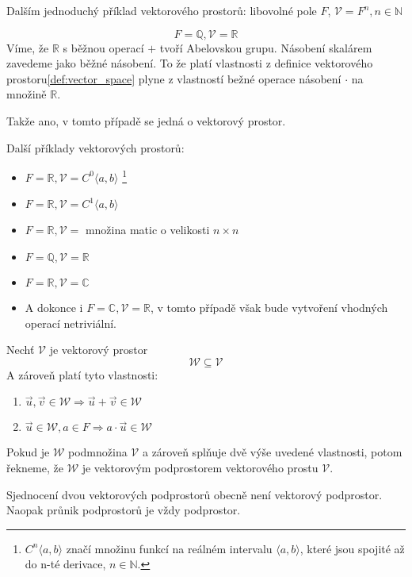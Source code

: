 Dalším jednoduchý příklad vektorového prostorů:
libovolné pole $F$, $\mathcal{V} = F^n, n \in \mathbb{N}$

\begin{example}
    $$F = \mathbb{Q}, \mathcal{V} = \mathbb{R}$$
    Víme, že $\mathbb{R}$ s běžnou operací $+$ tvoří Abelovskou grupu.
    Násobení skalárem zavedeme jako běžné násobení.
    To že platí vlastnosti z definice vektorového prostoru\ref{def:vector_space}
    plyne z vlastností bežné operace násobení $\cdot$ na množině $\mathbb{R}$.

    Takže ano, v tomto případě se jedná o vektorový prostor.
\end{example}

Další příklady vektorových prostorů:
\begin{itemize}
    \item $F = \mathbb{R}, \mathcal{V} = C^0\langle a, b \rangle$
        \footnote{$C^n\langle a,b \rangle$ značí množinu funkcí na reálném intervalu
        $\langle a,b \rangle$, které jsou spojité až do n-té derivace, $n \in \mathbb{N}$.}
    \item $F = \mathbb{R}, \mathcal{V} = C^1\langle a, b \rangle$
    \item $F = \mathbb{R}, \mathcal{V}=$ množina matic o velikosti $n \times n$
    \item $F = \mathbb{Q}, \mathcal{V} = \mathbb{R}$
    \item $F = \mathbb{R}, \mathcal{V} = \mathbb{C}$
    \item A dokonce i $F = \mathbb{C}, \mathcal{V} = \mathbb{R}$, v tomto případě však bude
        vytvoření vhodných operací netriviální.
\end{itemize}

\begin{definition}
    Nechť $\mathcal{V}$ je vektorový prostor
    $$\mathcal{W} \subseteq \mathcal{V}$$
    A zároveň platí tyto vlastnosti:
    \begin{enumerate}
        \item $\vec{u}, \vec{v} \in \mathcal{W} \Rightarrow \vec{u} + \vec{v} \in \mathcal{W}$
        \item $\vec{u} \in \mathcal{W}, a \in F \Rightarrow  a \cdot \vec{u} \in \mathcal{W}$
    \end{enumerate}

    Pokud je $\mathcal{W}$ podmnožina $\mathcal{V}$ a zároveň splňuje dvě výše uvedené vlastnosti,
    potom řekneme, že $\mathcal{W}$ je vektorovým podprostorem vektorového prostu $\mathcal{V}$.

    Sjednocení dvou vektorových podprostorů obecně není vektorový podprostor.
    Naopak průnik podprostorů je vždy podprostor.
\end{definition}

